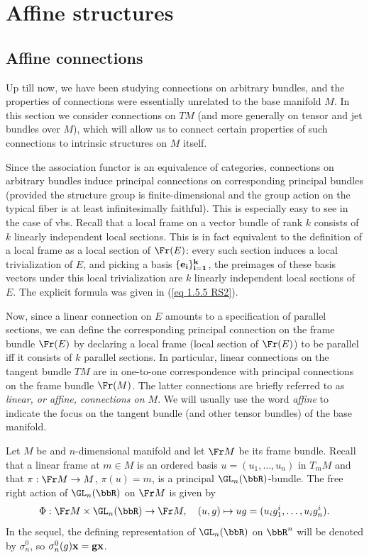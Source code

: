 \section{Affine structures}


\subsection{Affine connections}

Up till now, we have been studying connections on arbitrary bundles, and the properties of connections were essentially unrelated to the base manifold $M$. In this section we consider connections on $TM$ (and more generally on tensor and jet bundles over $M$), which will allow us to connect certain properties of such connections to intrinsic structures on $M$ itself.

Since the association functor is an equivalence of categories, connections on arbitrary bundles induce principal connections on corresponding principal bundles (provided the structure group is finite-dimensional and the group action on the typical fiber is at least infinitesimally faithful). This is especially easy to see in the case of \glspl{vb}. Recall that a local frame on a vector bundle of rank $k$ consists of $k$ linearly independent local sections. This is in fact equivalent to the definition of a local frame as a local section of $\Fr(E)$: every such section induces a local trivialization of $E$, and picking a basis $\{\bf{e}_i\}_{i=1}^k$, the preimages of these basis vectors under this local trivialization are $k$ linearly independent local sections of $E$. The explicit formula was given in (\ref{eq 1.5.5 RS2}).

Now, since a linear connection on $E$ amounts to a specification of parallel sections, we can define the corresponding principal connection on the frame bundle $\Fr(E)$ by declaring a local frame (local section of $\Fr(E)$) to be parallel iff it consists of $k$ parallel sections. In particular, linear connections on the tangent bundle $TM$ are in one-to-one correspondence with principal connections on the frame bundle $\Fr(M)$. The latter connections are briefly referred to as \emph{linear, or affine, connections on $M$}. We will usually use the word \emph{affine} to indicate the focus on the tangent bundle (and other tensor bundles) of the base manifold.

Let $M$ be and $n$-dimensional manifold and let $\Fr M$ be its frame bundle. Recall that a linear frame at $m\in M$ is an ordered basis $u=(u_1,\ldots,u_n)$ in $T_m M$ and that $\pi:\Fr M\to M$, $\pi(u)=m$, is a principal $\GL_n(\bbR)$-bundle. The free right action of $\GL_n(\bbR)$ on $\Fr M$ is given by
\[\Phi:\Fr M\times \GL_n(\bbR)\to \Fr M,\quad (u,g)\mapsto ug=(u_ig^i_1,\ldots,u_ig^i_n).\]
In the sequel, the defining representation of $\GL_n(\bbR)$ on $\bbR^n$ will be denoted by $\sigma^0_n$, so $\sigma^0_n(g)\bf{x}=g\bf{x}$.


